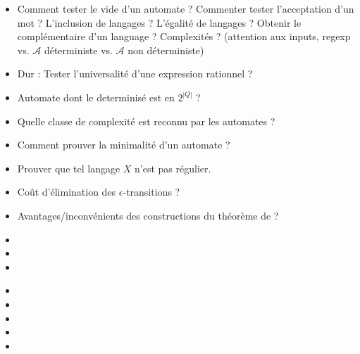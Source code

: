 \documentclass{agregfiche}
\begin{document}
\secquestionsclassiques
\begin{itemize}
\item Comment tester le vide d'un automate ? Commenter tester 
l'acceptation d'un mot ? L'inclusion de langages ? L'égalité de 
langages ? Obtenir le complémentaire d'un language ? Complexités ? 
(attention aux inputs, regexp vs. $\mathcal{A}$ déterministe vs. 
$\mathcal{A}$ non déterministe)


\item Dur : Tester l'universalité d'une expression rationnel ?
\item Automate dont le determinisé est en $2^{|Q|}$ ?
\item Quelle classe de complexité est reconnu par les automates ?
\item Comment prouver la minimalité d'un automate ?
\item Prouver que tel langage $X$ n'est pas régulier.
\item Coût d'élimination des $\epsilon$-transitions ?
\item Avantages/inconvénients des constructions du théorème de  
 ?


\end{itemize}

\secreferences
\begin{itemize}
\item 
\item 
\item 
\end{itemize}

\secdev
\begin{itemize}
\item 
\item 
\item 
\item 
\item 

\end{itemize}
\end{document}
